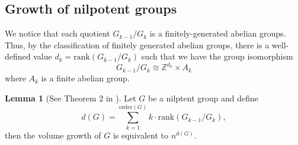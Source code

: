 \documentclass[11pt,a4paper,reqno]{amsart}
\theoremstyle{plain}
\theoremstyle{definition}
\newtheorem{lemma}[theorem]{Lemma}
\theoremstyle{definition}
\begin{document}
\subsection{Growth of nilpotent groups}

We notice that each quotient
$
	G_{k-1}/G_{k}
$
is a finitely-generated abelian groups.
Thus, by the classification of finitely generated abelian groups, there is a well-defined value $d_k= \mathrm{rank}(G_{k-1}/G_k)$ such that we have the group isomorphism
\[
	G_{k-1}/G_{k}
	\cong
	\mathbb{Z}^{d_k}
	\times
	A_k
\]
where $A_k$ is a finite abelian group.

\begin{lemma}[See Theorem 2 in \cite{Bass1972}]
Let $G$ be a nilptent group and define
\[
d(G)
=
\sum_{k=1}^{\mathrm{order}(G)}
k\cdot \mathrm{rank}(G_{k-1}/G_{k}),
\]
then the volume growth of $G$ is equivalent to $n^{d(G)}$.
\end{lemma}

\printbibliography
\end{document}

